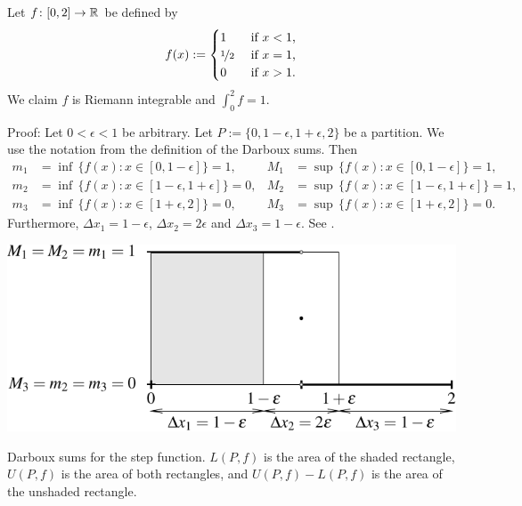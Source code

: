 \begin{example}
Let $f \colon [0,2] \to {\mathbb{R}}$ be defined by
\begin{equation*}
f(x) :=
\begin{cases}
1 & \text{ if $x < 1$,}\\
\nicefrac{1}{2} & \text{ if $x = 1$,}\\
0 & \text{ if $x > 1$.}
\end{cases}
\end{equation*}
We claim $f$ is Riemann integrable and $\int_0^2 f = 1$.

Proof: Let $0 < \epsilon < 1$ be arbitrary.
Let $P := \{0, 1-\epsilon, 1+\epsilon, 2\}$ be a partition.  We use the notation from
the definition of the Darboux sums.  Then
\begin{align*}
m_1 &= \inf \, \bigl\{ f(x) : x \in [0,1-\epsilon] \bigr\} = 1 , & 
M_1 &= \sup \, \bigl\{ f(x) : x \in [0,1-\epsilon] \bigr\} = 1 , \\
m_2 &= \inf \, \bigl\{ f(x) : x \in [1-\epsilon,1+\epsilon] \bigr\} = 0 , & 
M_2 &= \sup \, \bigl\{ f(x) : x \in [1-\epsilon,1+\epsilon] \bigr\} = 1 , \\
m_3 &= \inf \, \bigl\{ f(x) : x \in [1+\epsilon,2] \bigr\} = 0 , & 
M_3 &= \sup \, \bigl\{ f(x) : x \in [1+\epsilon,2] \bigr\} = 0 .
\end{align*}
Furthermore, $\Delta x_1 = 1-\epsilon$, $\Delta x_2 = 2\epsilon$ and
$\Delta x_3 = 1-\epsilon$.
See .
\begin{myfigureht}
\includegraphics{figures/darbouxfigstep}
\caption{Darboux sums for the step function.  $L(P,f)$ is the area of the
shaded rectangle, $U(P,f)$ is the area of both rectangles, and
$U(P,f)-L(P,f)$ is the area of the unshaded rectangle.\label{darbouxfigstep}}
\end{myfigureht}


\end{example}
